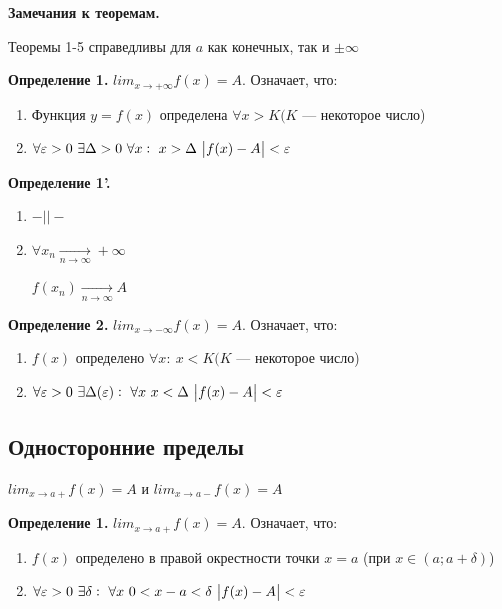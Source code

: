 \documentclass{article}
\begin{document}
  \textbf{Замечания к теоремам.}
  
  Теоремы 1-5 справедливы для \(a\) как конечных, так и \(\pm\infty\)

  \textbf{Определение 1.} \(lim_{x \rightarrow +\infty} f(x) = A\). Означает, что:
  \begin{enumerate}
    \item Функция \(y = f(x)\) определена \(\forall x > K(K\) --- некоторое число)
    \item \(\forall \varepsilon > 0\ \exists \Delta > 0\ \forall x:\ x > \Delta\ \abs{f(x)-A} < \varepsilon\)
  \end{enumerate}

  \textbf{Определение 1'.} 
  \begin{enumerate}
    \item \(-||-\)
    \item \( \forall x_n \xrightarrow[n \rightarrow \infty]{} +\infty \)
    
    \(f(x_n) \xrightarrow[n \rightarrow \infty]{} A\)
  \end{enumerate}

  
  \textbf{Определение 2.} \(lim_{x \rightarrow -\infty} f(x) = A\). Означает, что:
  \begin{enumerate}
    \item \(f(x)\) определено \(\forall x:\ x < K(K\) --- некоторое число)
    \item \(\forall \varepsilon > 0\ \exists \Delta(\varepsilon):\ \forall x\ x < \Delta\ \abs{f(x)-A}<\varepsilon\)
  \end{enumerate}

  
  \subsection{Односторонние пределы}

  \( lim_{x \rightarrow a+} f(x) = A \) и \( lim_{x \rightarrow a-} f(x) = A \)

  \textbf{Определение 1.} \( lim_{x \rightarrow a+} f(x) = A \). Означает, что:

  \begin{enumerate}
    \item \(f(x)\) определено в правой окрестности точки \(x = a\) (при \( x \in (a; a + \delta) \))
    \item \(\forall \varepsilon > 0\ \exists \delta:\ \forall x\ 0 < x-a < \delta\ \abs{f(x)-A}<\varepsilon\)
  \end{enumerate}
\end{document}
